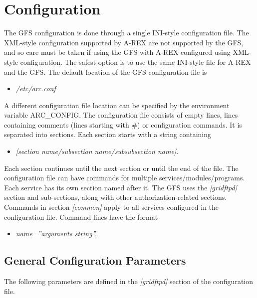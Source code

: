 \documentclass{article}
\begin{document}
\section{Configuration}

The GFS configuration is done through a single INI-style configuration
file. The XML-style configuration supported by A-REX are not supported
by the GFS, and so care must be taken if using the GFS with A-REX
configured using XML-style configuration. The safest option is to use
the same INI-style file for A-REX and the GFS. The default location of
the GFS configuration file is

\begin{itemize}
\item \textit{/etc/arc.conf}
\end{itemize}

A different configuration file location can be specified by the
environment variable ARC\_CONFIG. The configuration file
consists of empty lines, lines containing comments (lines starting
with \#) or configuration commands. It is separated into
sections. Each section starts with a string containing

\begin{itemize}
\item \emph{{[}section name/subsection name/subsubsection name]}. 
\end{itemize}

Each section continues until the next section or until the end of the
file. The configuration file can have commands for multiple
services/modules/programs. Each service has its own section named
after it. The GFS uses the \emph{{[}gridftpd]} section and
sub-sections, along with other authorization-related
sections. Commands in section \emph{{[}common]} apply to all services
configured in the configuration file. Command lines have the format

\begin{itemize}
\item \emph{name=''arguments string''.}
\end{itemize}

\subsection{General Configuration Parameters}

The following parameters are defined in the \emph{{[}gridftpd]}
section of the configuration file.
\end{document}
